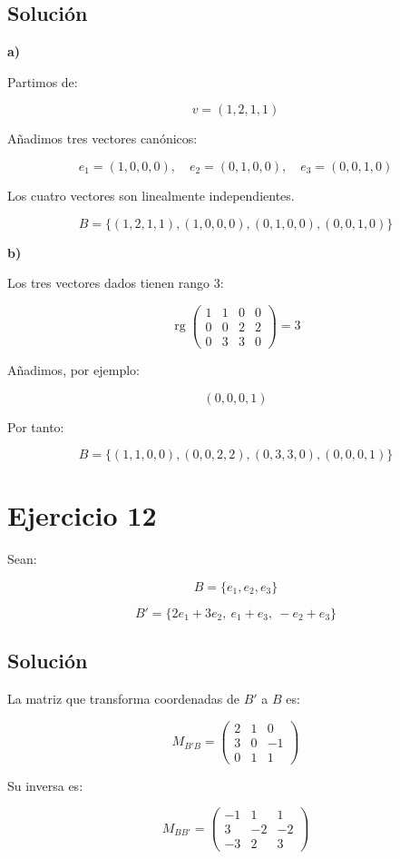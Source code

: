 \documentclass[11pt,a4paper]{article}
\newcommand{\rg}{\operatorname{rg}}
\begin{document}
	\subsection{Solución}

	\textbf{a)}

	Partimos de:

	\[
	v=(1,2,1,1)
	\]

	Añadimos tres vectores canónicos:

	\[
	e_1=(1,0,0,0),
	\quad
	e_2=(0,1,0,0),
	\quad
	e_3=(0,0,1,0)
	\]

	Los cuatro vectores son linealmente independientes.

	\[
	\boxed{
	B=
	\{(1,2,1,1),(1,0,0,0),(0,1,0,0),(0,0,1,0)\}
	}
	\]

	\textbf{b)}

	Los tres vectores dados tienen rango $3$:

	\[
	\rg
	\begin{pmatrix}
	1&1&0&0\\
	0&0&2&2\\
	0&3&3&0
	\end{pmatrix}
	=
	3
	\]

	Añadimos, por ejemplo:

	\[
	(0,0,0,1)
	\]

	Por tanto:

	\[
	\boxed{
	B=
	\{(1,1,0,0),(0,0,2,2),(0,3,3,0),(0,0,0,1)\}
	}
	\]

\section{Ejercicio 12}
	Sean:

	\[
	B=\{e_1,e_2,e_3\}
	\]

	\[
	B'=
	\{2e_1+3e_2,\ e_1+e_3,\ -e_2+e_3\}
	\]

	\subsection{Solución}

	La matriz que transforma coordenadas de $B'$ a $B$ es:

	\[
	M_{B'B}
	=
	\begin{pmatrix}
	2&1&0\\
	3&0&-1\\
	0&1&1
	\end{pmatrix}
	\]

	Su inversa es:

	\[
	M_{BB'}
	=
	\begin{pmatrix}
	-1&1&1\\
	3&-2&-2\\
	-3&2&3
	\end{pmatrix}
	\]
\end{document}
